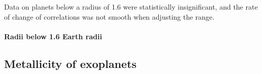 \documentclass[a4paper,twocolumn,12pt]{article}
\begin{document}
Data on planets below a radius of 1.6 were statistically insignificant, and the rate of change of correlations was not smooth when adjusting the range.


\paragraph{Radii below 1.6 Earth radii}


\subsection{Metallicity of exoplanets}





\vspace{-1em}
\footnotesize

\end{document}

